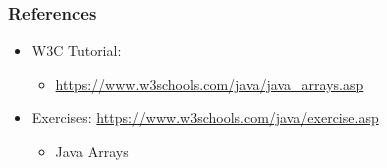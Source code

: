 \documentclass{beamer}
\begin{document}
	\begin{frame}
		\frametitle{References}
		\begin{itemize}
			\item W3C Tutorial: 
			\begin{itemize}
				\item \url{https://www.w3schools.com/java/java_arrays.asp}
			\end{itemize}
			\item Exercises: \url{https://www.w3schools.com/java/exercise.asp}
			\begin{itemize}
				\item Java Arrays
			\end{itemize}
		\end{itemize}
		
	\end{frame}
\end{document}

